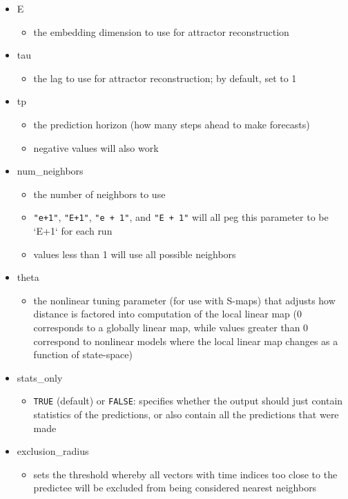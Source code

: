 \begin{itemize}
\begin{itemize}
	\end{itemize}
\item E
	\begin{itemize}
	\item the embedding dimension to use for attractor reconstruction
	\end{itemize}
\item tau
	\begin{itemize}
	\item the lag to use for attractor reconstruction; by default, set to 1
	\end{itemize}
\item tp
	\begin{itemize}
	\item the prediction horizon (how many steps ahead to make forecasts)
	\item negative values will also work
	\end{itemize}
\item num\_neighbors
	\begin{itemize}
	\item the number of neighbors to use
	\item \lstinline{"e+1"}, \lstinline{"E+1"}, \lstinline{"e + 1"}, and \lstinline{"E + 1"} will all peg this parameter to be `E+1` for each run
	\item values less than 1 will use all possible neighbors
	\end{itemize}
\item theta
	\begin{itemize}
	\item the nonlinear tuning parameter (for use with S-maps) that adjusts how distance is factored into computation of the local linear map (0 corresponds to a globally linear map, while values greater than 0 correspond to nonlinear models where the local linear map changes as a function of state-space)
	\end{itemize}
\item stats\_only
	\begin{itemize}
	\item \lstinline{TRUE} (default) or \lstinline{FALSE}: specifies whether the output should just contain statistics of the predictions, or also contain all the predictions that were made
	\end{itemize}
\item exclusion\_radius
	\begin{itemize}
	\item sets the threshold whereby all vectors with time indices too close to the predictee will be excluded from being considered nearest neighbors

\end{itemize}
\end{itemize}
